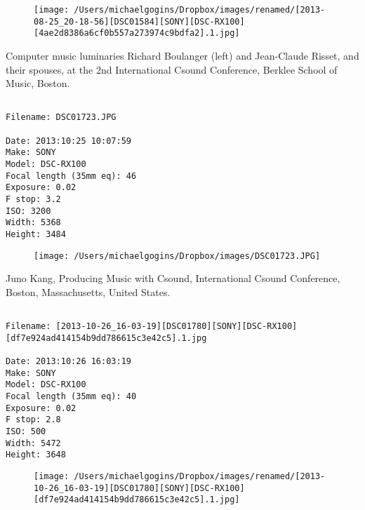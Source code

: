 \documentclass[11pt,letter,DIV=14,paper=landscape]{scrbook}
\begin{document}
\begin{figure}
\texttt{[image: /Users/michaelgogins/Dropbox/images/renamed/[2013-08-25\_20-18-56][DSC01584][SONY][DSC-RX100][4ae2d8386a6cf0b557a273974c9bdfa2].1.jpg]}
\end{figure}
    
\clearpage
\noindent Computer music luminaries Richard Boulanger (left) and Jean-Claude Risset, and their spouses, at the 2nd International Csound Conference, Berklee School of Music, Boston.
\noindent
\begin{lstlisting}

Filename: DSC01723.JPG

Date: 2013:10:25 10:07:59
Make: SONY
Model: DSC-RX100
Focal length (35mm eq): 46
Exposure: 0.02
F stop: 3.2
ISO: 3200
Width: 5368
Height: 3484
\end{lstlisting}
\clearpage

\begin{figure}
\texttt{[image: /Users/michaelgogins/Dropbox/images/DSC01723.JPG]}
\end{figure}
    
\clearpage
\noindent Juno Kang, Producing Music with Csound, International Csound Conference, Boston, Massachusetts, United States.
\noindent
\begin{lstlisting}

Filename: [2013-10-26_16-03-19][DSC01780][SONY][DSC-RX100][df7e924ad414154b9dd786615c3e42c5].1.jpg

Date: 2013:10:26 16:03:19
Make: SONY
Model: DSC-RX100
Focal length (35mm eq): 40
Exposure: 0.02
F stop: 2.8
ISO: 500
Width: 5472
Height: 3648
\end{lstlisting}
\clearpage

\begin{figure}
\texttt{[image: /Users/michaelgogins/Dropbox/images/renamed/[2013-10-26\_16-03-19][DSC01780][SONY][DSC-RX100][df7e924ad414154b9dd786615c3e42c5].1.jpg]}
\end{figure}
    
\end{document}
